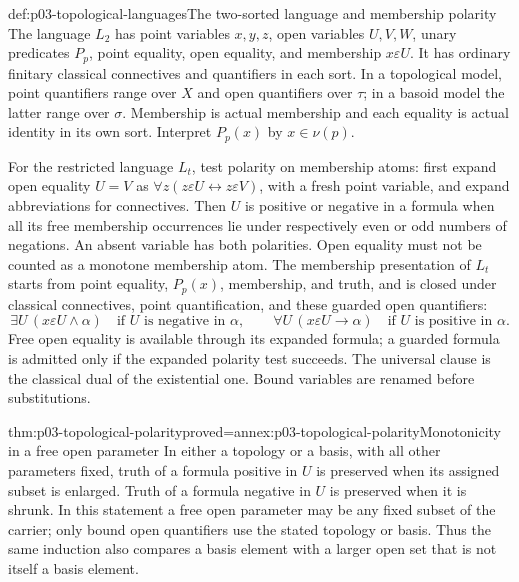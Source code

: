\begin{hbdefinition}{def:p03-topological-languages}{The two-sorted language and membership polarity}
The language \(L_2\) has point variables \(x,y,z\), open variables
\(U,V,W\), unary predicates \(P_p\), point equality, open equality,
and membership \(x\varepsilon U\). It has ordinary finitary classical
connectives and quantifiers in each sort. In a topological model, point
quantifiers range over \(X\) and open quantifiers over \(\tau\);
in a basoid model the latter range over \(\sigma\).
Membership is actual membership and each equality is actual identity in
its own sort. Interpret \(P_p(x)\) by \(x\in\nu(p)\).

For the restricted language \(L_t\), test polarity on membership atoms:
first expand open equality \(U=V\) as
\(\forall z(z\varepsilon U\leftrightarrow z\varepsilon V)\),
with a fresh point variable, and expand abbreviations for connectives.
Then \(U\) is positive or negative in a formula when all its free
membership occurrences lie under respectively even or odd numbers of
negations. An absent variable has both polarities. Open equality must
not be counted as a monotone membership atom.
The membership presentation of \(L_t\) starts from point equality,
\(P_p(x)\), membership, and truth, and is closed under classical
connectives, point quantification, and these guarded open quantifiers:
\[
 \exists U\,(x\varepsilon U\land\alpha)
       \quad\text{if \(U\) is negative in \(\alpha\)},
 \qquad
 \forall U\,(x\varepsilon U\to\alpha)
       \quad\text{if \(U\) is positive in \(\alpha\)}.
\]
Free open equality is available through its expanded formula; a guarded
formula is admitted only if the expanded polarity test succeeds.
The universal clause is the classical dual of the existential one.
Bound variables are renamed before substitutions.
\end{hbdefinition}

\begin{hblemma}{thm:p03-topological-polarity}{proved=annex:p03-topological-polarity}{Monotonicity in a free open parameter}
In either a topology or a basis, with all other parameters fixed, truth of
a formula positive in \(U\) is preserved when its assigned subset is
enlarged. Truth of a formula negative in \(U\) is preserved when it is
shrunk. In this statement a free open parameter may be any fixed subset of
the carrier; only bound open quantifiers use the stated topology or basis.
Thus the same induction also compares a basis element with a larger open
set that is not itself a basis element.
\end{hblemma}

